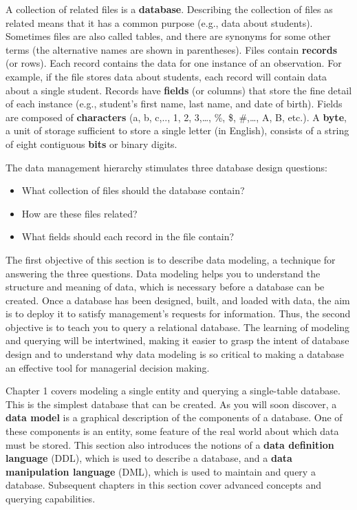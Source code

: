 \documentclass[
]{article}
\begin{document}
A collection of related files is a \textbf{database}. Describing the
collection of files as related means that it has a common purpose (e.g.,
data about students). Sometimes files are also called tables, and there
are synonyms for some other terms (the alternative names are shown in
parentheses). Files contain \textbf{records} (or rows). Each record
contains the data for one instance of an observation. For example, if
the file stores data about students, each record will contain data about
a single student. Records have \textbf{fields} (or columns) that store
the fine detail of each instance (e.g., student's first name, last name,
and date of birth). Fields are composed of \textbf{characters} (a, b,
c,.., 1, 2, 3,\ldots, \%, \$, \#,\ldots, A, B, etc.). A \textbf{byte}, a
unit of storage sufficient to store a single letter (in English),
consists of a string of eight contiguous \textbf{bits} or binary digits.

The data management hierarchy stimulates three database design
questions:

\begin{itemize}
\item
  What collection of files should the database contain?
\item
  How are these files related?
\item
  What fields should each record in the file contain?
\end{itemize}

The first objective of this section is to describe data modeling, a
technique for answering the three questions. Data modeling helps you to
understand the structure and meaning of data, which is necessary before
a database can be created. Once a database has been designed, built, and
loaded with data, the aim is to deploy it to satisfy management's
requests for information. Thus, the second objective is to teach you to
query a relational database. The learning of modeling and querying will
be intertwined, making it easier to grasp the intent of database design
and to understand why data modeling is so critical to making a database
an effective tool for managerial decision making.

Chapter 1 covers modeling a single entity and querying a single-table
database. This is the simplest database that can be created. As you will
soon discover, a \textbf{data model} is a graphical description of the
components of a database. One of these components is an entity, some
feature of the real world about which data must be stored. This section
also introduces the notions of a \textbf{data definition language}
(DDL), which is used to describe a database, and a \textbf{data
manipulation language} (DML), which is used to maintain and query a
database. Subsequent chapters in this section cover advanced concepts
and querying capabilities.
\end{document}
